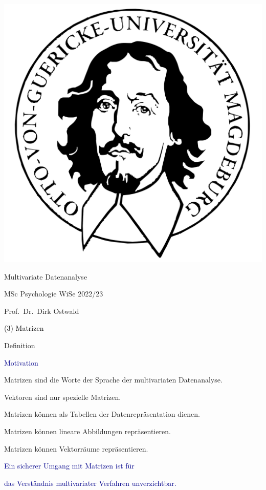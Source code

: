\documentclass[
  8pt,
  ignorenonframetext,
]{beamer}
\author{}
\date{\vspace{-2.5em}}
\begin{document}
\begin{frame}[plain]{}
\protect\hypertarget{section}{}
\center

\begin{center}\includegraphics[width=0.2\linewidth]{3_Abbildungen/mvda_3_otto} \end{center}

\vspace{2mm}

\Huge

Multivariate Datenanalyse \vspace{6mm}

\Large

MSc Psychologie WiSe 2022/23

\vspace{6mm}
\large

Prof.~Dr.~Dirk Ostwald
\end{frame}

\begin{frame}[plain]{}
\protect\hypertarget{section-1}{}
\vfill
\center
\huge

\textcolor{black}{(3) Matrizen} \vfill
\end{frame}

\begin{frame}{Definition}
\protect\hypertarget{definition}{}
\large

\textcolor{darkblue}{Motivation} 

\normalsize

Matrizen sind die Worte der Sprache der multivariaten Datenanalyse.

Vektoren sind nur spezielle Matrizen.

Matrizen können als Tabellen der Datenrepräsentation dienen.

Matrizen können lineare Abbildungen repräsentieren.

Matrizen können Vektorräume repräsentieren. \vspace{2mm}

\center
{}

\textcolor{darkblue}{Ein sicherer Umgang mit Matrizen ist für}

\textcolor{darkblue}{das Verständnis multivariater Verfahren unverzichtbar.}
\end{frame}
\end{document}
